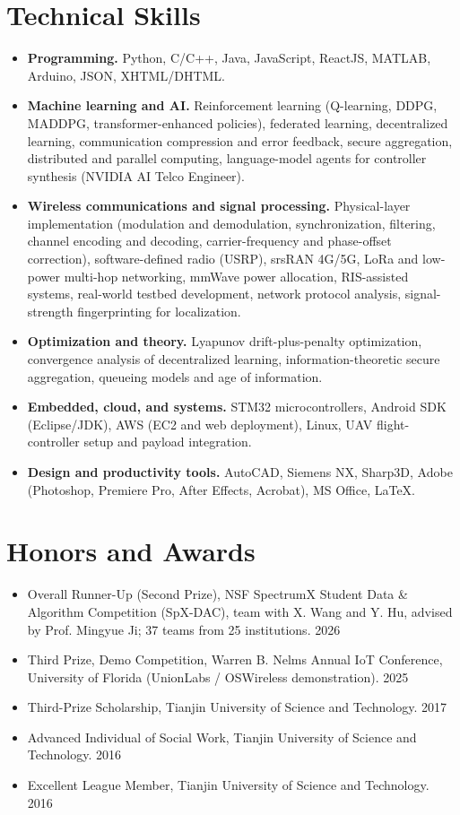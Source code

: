 \documentclass[10pt]{article}
\begin{document}
\section*{Technical Skills}
\begin{itemize}
\item \textbf{Programming.} Python, C/C++, Java, JavaScript, ReactJS, MATLAB, Arduino, JSON, XHTML/DHTML.
\item \textbf{Machine learning and AI.} Reinforcement learning (Q-learning, DDPG, MADDPG, transformer-enhanced policies), federated learning, decentralized learning, communication compression and error feedback, secure aggregation, distributed and parallel computing, language-model agents for controller synthesis (NVIDIA AI Telco Engineer).
\item \textbf{Wireless communications and signal processing.} Physical-layer implementation (modulation and demodulation, synchronization, filtering, channel encoding and decoding, carrier-frequency and phase-offset correction), software-defined radio (USRP), srsRAN 4G/5G, LoRa and low-power multi-hop networking, mmWave power allocation, RIS-assisted systems, real-world testbed development, network protocol analysis, signal-strength fingerprinting for localization.
\item \textbf{Optimization and theory.} Lyapunov drift-plus-penalty optimization, convergence analysis of decentralized learning, information-theoretic secure aggregation, queueing models and age of information.
\item \textbf{Embedded, cloud, and systems.} STM32 microcontrollers, Android SDK (Eclipse/JDK), AWS (EC2 and web deployment), Linux, UAV flight-controller setup and payload integration.
\item \textbf{Design and productivity tools.} AutoCAD, Siemens NX, Sharp3D, Adobe (Photoshop, Premiere Pro, After Effects, Acrobat), MS Office, \LaTeX.
\end{itemize}

\section*{Honors and Awards}
\begin{itemize}
\item Overall Runner-Up (Second Prize), NSF SpectrumX Student Data \& Algorithm Competition (SpX-DAC), team with X. Wang and Y. Hu, advised by Prof. Mingyue Ji; 37 teams from 25 institutions. \hfill 2026
\item Third Prize, Demo Competition, Warren B. Nelms Annual IoT Conference, University of Florida (UnionLabs / OSWireless demonstration). \hfill 2025
\item Third-Prize Scholarship, Tianjin University of Science and Technology. \hfill 2017
\item Advanced Individual of Social Work, Tianjin University of Science and Technology. \hfill 2016
\item Excellent League Member, Tianjin University of Science and Technology. \hfill 2016
\end{itemize}


\par\vspace{6pt}{\small Last updated October 2026.}
\end{document}
